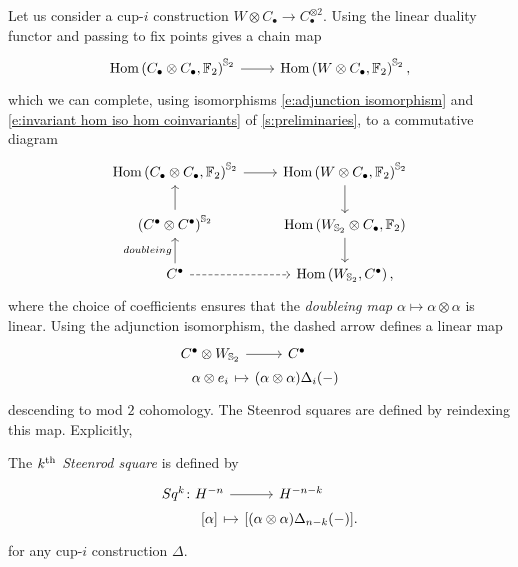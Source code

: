 Let us consider a cup-$i$ construction $W \otimes C_\bullet \to C_\bullet^{\otimes 2}$.
Using the linear duality functor and passing to fix points gives a chain map
\begin{equation*}
\begin{tikzcd}
\Hom\left(C_\bullet \otimes C_\bullet, \Ftwo \right)^{\Sym_2} \arrow[r] &
\Hom\left(W \otimes C_\bullet, \Ftwo \right)^{\Sym_2},
\end{tikzcd}
\end{equation*}
which we can complete, using isomorphisms \eqref{e:adjunction isomorphism} and \eqref{e:invariant hom iso hom coinvariants} of \cref{s:preliminaries}, to a commutative diagram
\begin{equation*}
\begin{tikzcd}
\Hom\left(C_\bullet \otimes C_\bullet, \Ftwo \right)^{\Sym_2} \arrow[r] &
\Hom\left(W \otimes C_\bullet, \Ftwo \right)^{\Sym_2} \arrow[d] \\
\left(C^\bullet \otimes C^\bullet\right)^{\Sym_2} \arrow[u]&
\Hom\left(W_{\Sym_2} \otimes C_\bullet, \Ftwo \right) \arrow[d] \\
C^\bullet \arrow[u, "doubleing"] \arrow[r, dashed]&
\Hom\left(W_{\Sym_2}, C^\bullet\right),
\end{tikzcd}
\end{equation*}
where the choice of coefficients ensures that the \textit{doubleing map} $\alpha \mapsto \alpha \otimes \alpha$ is linear.
Using the adjunction isomorphism, the dashed arrow defines a linear map
\begin{equation} \label{e:Steenrod squares parameterized}
\begin{tikzcd}[row sep=0pt, column sep = small]
C^\bullet \otimes W_{\Sym_2} \arrow[r] &[-10pt] C^\bullet \\
\alpha \otimes e_i \arrow[r, |->] & (\alpha \otimes \alpha)\Delta_i(-)
\end{tikzcd}
\end{equation}
descending to mod $2$ cohomology.
The Steenrod squares are defined by reindexing this map.
Explicitly,
\begin{definition} \label{d:steenrod squares}
	The \textit{$k^{\mathrm{th}}$ Steenrod square} is defined by
	\begin{equation} \label{e:steenrod squares}
	\begin{tikzcd}[row sep=0pt, column sep=tiny]
	Sq^k \colon H^{-n} \arrow[r] & H^{-n-k} \\
	\phantom{Sq^k \colon}{[\alpha]} \arrow[r, |->] & {\left[(\alpha \otimes \alpha)\Delta_{n-k}(-) \right]}.
	\end{tikzcd}
	\end{equation}
	for any cup-$i$ construction $\Delta$.
\end{definition}

